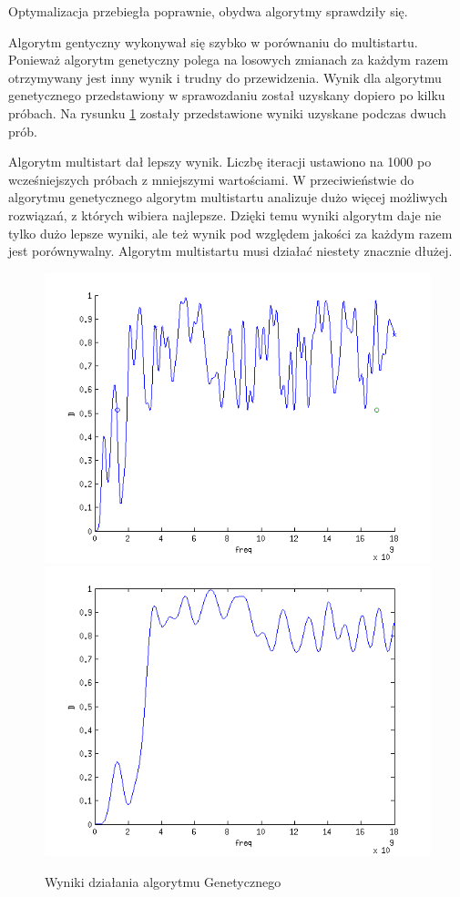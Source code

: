 \documentclass[10pt,a4paper]{article}
\begin{document}
\vspace{0.5cm}
Optymalizacja przebiegła poprawnie, obydwa algorytmy sprawdziły się.

Algorytm gentyczny wykonywał się szybko w porównaniu do multistartu. Ponieważ algorytm genetyczny polega na losowych zmianach za każdym razem otrzymywany jest inny wynik i trudny do przewidzenia.
Wynik dla algorytmu genetycznego przedstawiony w sprawozdaniu został uzyskany dopiero po kilku próbach. Na rysunku \ref{fig:genetyczny_bad} zostały przedstawione wyniki uzyskane podczas dwuch prób.

Algorytm multistart dał lepszy wynik. Liczbę iteracji ustawiono na 1000 po wcześniejszych próbach z mniejszymi wartościami. W przeciwieństwie do algorytmu genetycznego algorytm multistartu analizuje dużo więcej możliwych rozwiązań, z których wibiera najlepsze. Dzięki temu wyniki algorytm daje nie tylko dużo lepsze wyniki, ale też wynik pod względem jakości za każdym razem jest porównywalny. Algorytm multistartu musi działać niestety znacznie dłużej.

\begin{figure}[H]
  \caption{Wyniki działania algorytmu Genetycznego}
  \centering
    \includegraphics[scale=0.50]{genetyczny_bad}
    \includegraphics[scale=0.50]{genetyczny}
  \label{fig:genetyczny_bad}
\end{figure}
\end{document}
